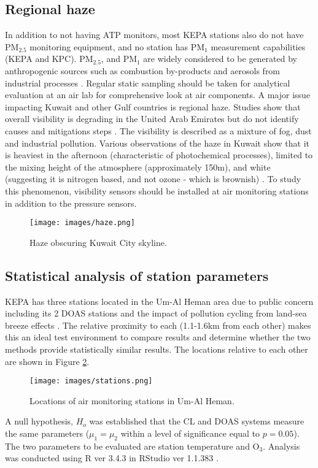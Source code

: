 \subsection{Regional haze}
In addition to not having ATP monitors, most KEPA stations also do not have PM$_{2.5}$ monitoring equipment, and no station has PM$_{1}$ measurement capabilities (KEPA and KPC). PM$_{2.5}$, and PM$_{1}$ are widely considered to be generated by anthropogenic sources such as combustion by-products and aerosols from industrial processes \citep{Squizzato2016}.  Regular static sampling should be taken for analytical evaluation at an air lab for comprehensive look at air components. A major issue impacting Kuwait and other Gulf countries is regional haze. Studies show that overall visibility is degrading in the United Arab Emirates but do not identify causes and mitigations steps \citep{Amal2017}. The visibility is described as a mixture of fog, dust and industrial pollution. Various observations of the haze in Kuwait show that it is heaviest in the afternoon (characteristic of photochemical processes), limited to the mixing height of the atmosphere (approximately 150m), and white (suggesting it is nitrogen based, and not ozone - which is brownish) \citep{Liu2013}. To study this phenomenon, visibility sensors should be installed at air monitoring stations in addition to the pressure sensors.
%
\begin{figure}[H]
\centering
\texttt{[image: images/haze.png]} 
\caption{Haze obscuring Kuwait City skyline.}
\label{fig:haze}
\end{figure}
%


\subsection{Statistical analysis of station parameters}
KEPA has three stations located in the Um-Al Heman area due to public concern including its 2 DOAS stations \citep{Carlisle2010} and the impact of pollution cycling from land-sea breeze effects \cite{Freeman2017}.  The relative proximity to each (1.1-1.6km from each other) makes this an ideal test environment to compare results and determine whether the two methods provide statistically similar results. The locations relative to each other are shown in Figure \ref{fig:stations}.

%
\begin{figure}[H]
\centering
\texttt{[image: images/stations.png]} 
\caption{Locations of air monitoring stations in Um-Al Heman.}
\label{fig:stations}
\end{figure}
%
A null hypothesis, $H_{o}$ was established that the CL and DOAS systems measure the same parameters ($\mu_{1} = \mu_{2}$ within a level of significance equal to $p=0.05$). The two parameters to be evaluated are station temperature and O$_{3}$. Analysis was conducted using R ver 3.4.3 in RStudio ver 1.1.383 \citep{r2013}.


